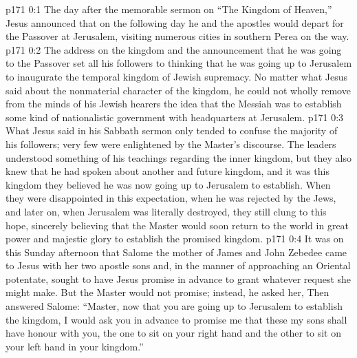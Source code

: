 \author{Midwayer Commission}
\vs p171 0:1 The day after the memorable sermon on “The Kingdom of Heaven,” Jesus announced that on the following day he and the apostles would depart for the Passover at Jerusalem, visiting numerous cities in southern Perea on the way.
\vs p171 0:2 The address on the kingdom and the announcement that he was going to the Passover set all his followers to thinking that he was going up to Jerusalem to inaugurate the temporal kingdom of Jewish supremacy. No matter what Jesus said about the nonmaterial character of the kingdom, he could not wholly remove from the minds of his Jewish hearers the idea that the Messiah was to establish some kind of nationalistic government with headquarters at Jerusalem.
\vs p171 0:3 What Jesus said in his Sabbath sermon only tended to confuse the majority of his followers; very few were enlightened by the Master’s discourse. The leaders understood something of his teachings regarding the inner kingdom,  but they also knew that he had spoken about another and future kingdom, and it was this kingdom they believed he was now going up to Jerusalem to establish. When they were disappointed in this expectation, when he was rejected by the Jews, and later on, when Jerusalem was literally destroyed, they still clung to this hope, sincerely believing that the Master would soon return to the world in great power and majestic glory to establish the promised kingdom.
\vs p171 0:4 \pc It was on this Sunday afternoon that Salome the mother of James and John Zebedee came to Jesus with her two apostle sons and, in the manner of approaching an Oriental potentate, sought to have Jesus promise in advance to grant whatever request she might make. But the Master would not promise; instead, he asked her,  Then answered Salome: “Master, now that you are going up to Jerusalem to establish the kingdom, I would ask you in advance to promise me that these my sons shall have honour with you, the one to sit on your right hand and the other to sit on your left hand in your kingdom.”
